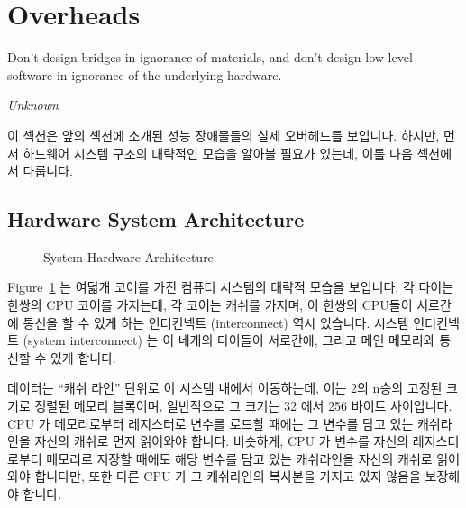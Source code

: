 
\section{Overheads}
\label{sec:cpu:Overheads}
%
\epigraph{Don't design bridges in ignorance of materials, and don't design
	  low-level software in ignorance of the underlying hardware.}
	 {\emph{Unknown}}

이 섹션은 앞의 섹션에 소개된 성능 장애물들의 실제 오버헤드를 보입니다.
하지만, 먼저 하드웨어 시스템 구조의 대략적인 모습을 알아볼 필요가 있는데, 이를
다음 섹션에서 다룹니다.

\subsection{Hardware System Architecture}
\label{sec:cpu:Hardware System Architecture}

\begin{figure}[tb]
\centering
{}
\caption{System Hardware Architecture}
\label{fig:cpu:System Hardware Architecture}
\end{figure}

Figure~\ref{fig:cpu:System Hardware Architecture}
는 여덟개 코어를 가진 컴퓨터 시스템의 대략적 모습을 보입니다.
각 다이는 한쌍의 CPU 코어를 가지는데, 각 코어는 캐쉬를 가지며, 이 한쌍의
CPU들이 서로간에 통신을 할 수 있게 하는 인터컨넥트 (interconnect) 역시
있습니다.
시스템 인터컨넥트 (system interconnect) 는 이 네개의 다이들이 서로간에, 그리고
메인 메모리와 통신할 수
있게 합니다.

데이터는 ``캐쉬 라인'' 단위로 이 시스템 내에서 이동하는데, 이는 2의 n승의
고정된 크기로 정렬된 메모리 블록이며, 일반적으로 그 크기는 32 에서 256 바이트
사이입니다.
CPU 가 메모리로부터 레지스터로 변수를 로드할 때에는 그 변수를 담고 있는
캐쉬라인을 자신의 캐쉬로 먼저 읽어와야 합니다.
비슷하게, CPU 가 변수를 자신의 레지스터로부터 메모리로 저장할 때에도 해당
변수를 담고 있는 캐쉬라인을 자신의 캐쉬로 읽어와야 합니다만, 또한 다른 CPU 가
그 캐쉬라인의 복사본을 가지고 있지 않음을 보장해야 합니다.


